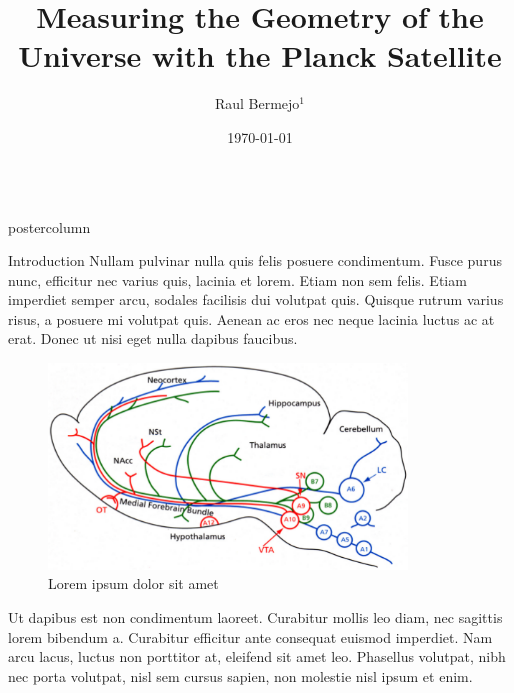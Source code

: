 \documentclass{beamer}
\title{\huge Measuring the Geometry of the Universe with the Planck Satellite}
\author{Raul Bermejo$^{1}$}
\institute[UniMelb]{$^{1}$School of Physics, University of Melbourne}
\date{\today}
\newlength{\columnheight}
\begin{document}
\begin{frame}
\begin{columns}
	\begin{column}{.43\textwidth}
		\begin{beamercolorbox}[center]{postercolumn}
			\begin{minipage}{.98\textwidth}  %
				\parbox[t][\columnheight]{\textwidth}{ %
					\begin{myblock}{Introduction}
						Nullam pulvinar nulla quis felis posuere condimentum. Fusce purus nunc, efficitur nec varius quis, lacinia et lorem. Etiam non sem felis. Etiam imperdiet semper arcu, sodales facilisis dui volutpat quis. Quisque rutrum varius risus, a posuere mi volutpat quis. Aenean ac eros nec neque lacinia luctus ac at erat. Donec ut nisi eget nulla dapibus faucibus.
						\vspace{0.4em}
						\begin{figure}
							\begin{minipage}{0.43\textwidth}
								\centering\includegraphics[width=0.85\textwidth]{img/mas.png}
								\caption{Lorem ipsum dolor sit amet \cite{Paivi}}
							\end{minipage}
							\hspace{1em}
						\end{figure}
					
					Ut dapibus est non condimentum laoreet. Curabitur mollis leo diam, nec sagittis lorem bibendum a. Curabitur efficitur ante consequat euismod imperdiet. Nam arcu lacus, luctus non porttitor at, eleifend sit amet leo. Phasellus volutpat, nibh nec porta volutpat, nisl sem cursus sapien, non molestie nisl ipsum et enim.
						
					\end{myblock}\vfill
					
}
\end{minipage}
\end{beamercolorbox}
\end{column}
\end{columns}
\end{frame}
\end{document}
